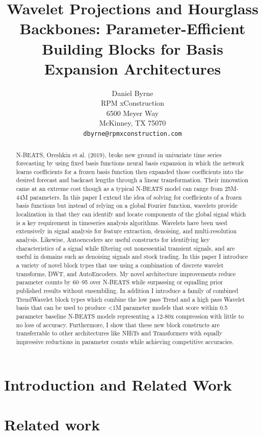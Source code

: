 \documentclass{article}
\title{Wavelet Projections and Hourglass Backbones: Parameter-Efficient Building Blocks for Basis Expansion Architectures}
\author{%
  Daniel Byrne \\  
  RPM xConstruction \\
  6500 Meyer Way \\
  McKinney, TX 75070 \\
  \texttt{dbyrne@rpmxconstruction.com}
}
\begin{document}
\maketitle

\begin{abstract}
N-BEATS, Oreshkin et al. (2019), broke new ground in univariate time series forecasting by using fixed basis 
functions neural basis expansion in which the network learns coefficients for a frozen basis function then 
expanded those coefficients into the desired forecast and backcast lengths through a linear transformation. 
Their innovation came at an extreme cost though as a typical N-BEATS model can range from 25M-44M parameters. 
In this paper I extend the idea of solving for coefficients of a frozen basis functions but instead of
relying on a global Fourier function, wavelets provide localization in that they can identify and locate 
components of the global signal which is a key requirement in timeseries analysis algorithms. Wavelets have 
been used extensively in signal analysis for feature extraction, denoising, and multi-resolution analysis.  
Likewise, Autoencoders are useful constructs for identifying key characteristics of a signal while filtering 
out nonessential transient signals, and are useful in domains such as denoising signals and stock trading.  
In this paper I introduce a variety of novel block types that use using a combination of discrete wavelet 
transforms, DWT, and AutoEncoders. My novel architecture improvements reduce parameter counts by 60–95%
over N-BEATS while surpassing or equalling prior published results without ensembiling. In addition I 
introduce a family of combined TrendWavelet block types which combine the low pass Trend and a high pass 
Wavelet basis that can be used to produce <1M parameter models that score within 0.5%
parameter baseline N-BEATS models representing a 12-80x compression with little to no loss of accuracy. 
Furthermore, I show that these new block constructs are transferrable to other architectures like NHiTs and 
Transformers with equally impressive reductions in parameter counts while achieving competitive accuracies.  
\end{abstract}

\section{Introduction and Related Work}
\label{sec:intro}

\section{Related work}
\label{sec:related}
\end{document}
